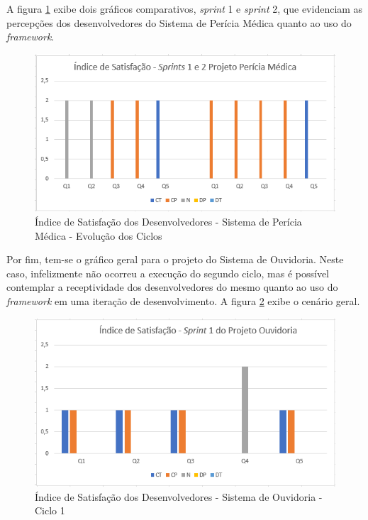 A figura \ref{fig:evolucaoPericia} exibe dois gráficos comparativos, \textit{sprint} 1 e \textit{sprint} 2, que evidenciam as percepções dos desenvolvedores do Sistema de Perícia Médica quanto ao uso do \textit{framework}.

\begin{figure}[h]
\includegraphics[width=\textwidth]{figuras/isd_pericia_medica.png}
\caption{Índice de Satisfação dos Desenvolvedores - Sistema de Perícia Médica - Evolução dos Ciclos}
\label{fig:evolucaoPericia}
\end{figure}

\hfill \break

\hfill \break

\hfill \break

\hfill \break

\hfill \break

Por fim, tem-se o gráfico geral para o projeto do Sistema de Ouvidoria. Neste caso, infelizmente não ocorreu a execução do segundo ciclo, mas é possível contemplar a receptividade dos desenvolvedores do mesmo quanto ao uso do \textit{framework} em uma iteração de desenvolvimento. A figura \ref{fig:evolucaoOuvdf} exibe o cenário geral.

\begin{figure}[h]
\includegraphics[width=\textwidth]{figuras/isd_ouvdf.png}
\caption{Índice de Satisfação dos Desenvolvedores - Sistema de Ouvidoria - Ciclo 1}
\label{fig:evolucaoOuvdf}
\end{figure}

